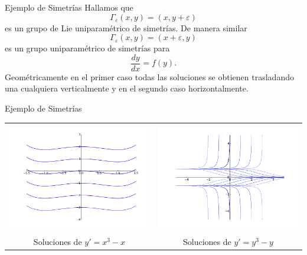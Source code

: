 \documentclass[handout,hyperref={colorlinks=true}]{beamer}
\renewcommand{\epsilon}{\varepsilon}
\begin{document}
\begin{frame}{Ejemplo de Simetrías}
Hallamos que 
\[\Gamma_{\epsilon}(x,y)=(x,y+\epsilon)\]
es un grupo de Lie uniparamétrico de simetrías. De manera similar
\[\Gamma_{\epsilon}(x,y)=(x+\epsilon,y)\]
es un grupo uniparamétrico de simetrías para 
\[\frac{dy}{dx}=f(y).\]
Geométricamente en el primer caso todas las soluciones se obtienen trasladando una cualquiera verticalmente y en el segundo caso horizontalmente.

\end{frame}

\begin{frame}{Ejemplo de Simetrías}

\begin{tabular}{cc}
\includegraphics[scale=.3]{imagenes/sol_paralelas.png} &\hspace{-1.5cm}\includegraphics[scale=.3]{imagenes/sol_paralelas2.png} \\
Soluciones de $y'=x^3-x$ &\hspace{-1.5cm}Soluciones de $y'=y^3-y$
\end{tabular}

\end{frame}
\end{document}
